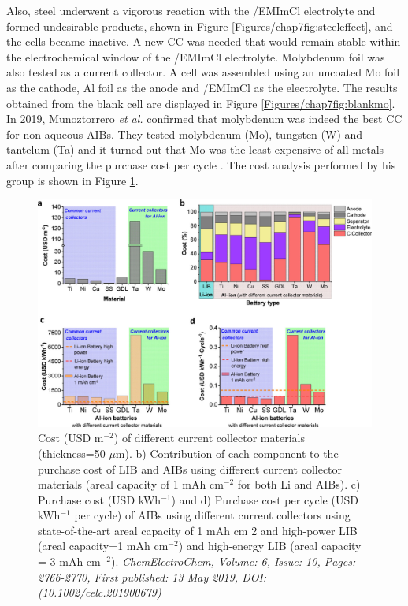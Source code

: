 Also, steel underwent a vigorous reaction with the /EMImCl electrolyte and formed undesirable products, shown in Figure \ref{Figures/chap7fig:steeleffect}, and the cells became inactive. A new CC was needed that would remain stable within the electrochemical window of the /EMImCl electrolyte. Molybdenum foil was also tested as a current collector. A cell was assembled using an uncoated Mo foil as the cathode, Al foil as the anode and /EMImCl as the electrolyte. The results obtained from the blank cell are displayed in Figure \ref{Figures/chap7fig:blankmo}. In 2019, Munoztorrero \textit{et al.} confirmed that molybdenum was indeed the best CC for non-aqueous AIBs. They tested molybdenum (Mo), tungsten (W) and tantelum (Ta) and it turned out that Mo was the least expensive of all metals after comparing the purchase cost per cycle \cite{munoztorrero_unexpected_2019}. The cost analysis performed by his group is shown in Figure \ref{Figures/chap7fig:goodmo}.
\begin{figure}[tbh!]
\centering
\includegraphics[width=\textwidth]{Figures/chap7fig/goodmo}
\caption{Cost (USD m$^{-2}$) of different current collector materials (thickness=50 $\mu$m). b) Contribution of each component to the purchase cost of LIB and AIBs using different current collector materials (areal capacity of 1 mAh cm$^{-2}$ for both Li and AIBs). c) Purchase cost (USD kWh$^{-1}$) and d) Purchase cost per cycle (USD kWh$^{-1}$ per cycle) of AIBs using different current collectors using state-of-the-art areal capacity of 1 mAh cm 2 and high-power LIB (areal capacity=1 mAh cm$^{-2}$) and high-energy LIB (areal capacity = 3 mAh cm$^{-2}$). \textit{ChemElectroChem, Volume: 6, Issue: 10, Pages: 2766-2770, First published: 13 May 2019, DOI: (10.1002/celc.201900679)}}
\label{Figures/chap7fig:goodmo}
\end{figure}

